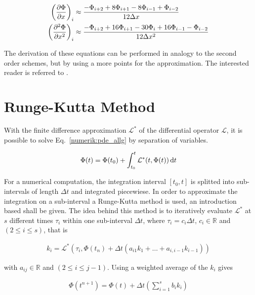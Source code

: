 \begin{align}
    \left(\pdn[\Phi]{x}\right)_i &\approx \frac{-\Phi_{i+2} + 8\Phi_{i+1} - 8\Phi_{i-1} + \Phi_{i-2}}{12\Delta x} \\
    \left(\pdn[^2\Phi]{x^2}\right)_i &\approx \frac{-\Phi_{i+2} + 16\Phi_{i+1} -30\Phi_i + 16\Phi_{i-1} - \Phi_{i-2}}{12\Delta x^2}
    \label{num:fd_o4_methods}
\end{align}

The derivation of these equations can be performed in analogy to the second order schemes, but by using a more points for the
approximation. The interested reader is referred to \citep{Fornberg1988}.

\newpage

\section{Runge-Kutta Method}
\label{numerik:rk_williamson_sec}

With the finite difference approximation $\mathcal{L^*}$ of the differential operator $\mathcal{L}$,
it is possible to solve Eq.~\ref{numerik:pde_allg} by separation of variables.

\begin{align}
    \Phi(t) = \Phi(t_0) + \int_{t_0}^{t} \mathcal{L^*} (t, \Phi(t)) \mathop{}\!\mathrm{d} t
\end{align}

For a numerical computation, the integration interval $[t_0, t]$  is splitted into sub-intervals  of length $\Delta t$ and integrated piecewiese.
In order to approximate the integration on a sub-interval a Runge-Kutta method is used, an introduction based \citep{Sarbach2012} shall be given.
The idea behind this method is to iteratively evaluate $\mathcal{L^*}$ at $s$ different times $\tau_i$ within one sub-interval $\Delta t$,
where $\tau_i=c_i \Delta t$, $c_i \in \mathbb{R}$ and  $(2\leq i \leq s)$, that is

\begin{align}
 k_i = \mathcal{L^*} \left(\tau_i, \Phi(t_n) + \Delta t \left(a_{i1} k_{1} + \dots + a_{i, i-1} k_{i-1} \right)\right)
\end{align}

with  $a_{ij} \in \mathbb{R}$ and $(2\leq i \leq j -1 )$.
Using a  weighted average of the $k_i$  gives

\begin{align}
    \Phi(t^{n+1}) = \Phi(t) + \Delta t \left( \sum_{i=1}^s b_i k_i \right)
\end{align}

